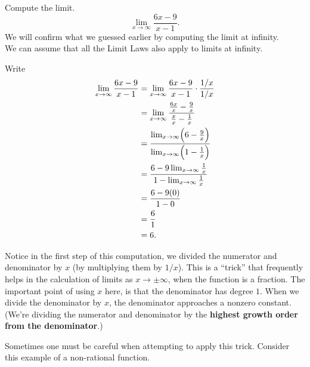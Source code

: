 \documentclass{ximera}
\begin{document}
\begin{example}  Compute the limit.
\[
\lim_{x\to\infty} \frac{6x-9}{x-1}.
\]
We will confirm what we guessed earlier by computing the limit at infinity.\\
 We can assume that all the Limit Laws also apply to limits at infinity.
\begin{explanation}
Write
\begin{align*}
\lim_{x\to\infty}\frac{6x-9}{x-1} &= \lim_{x\to\infty}\frac{6x-9}{x-1}\cdot \frac{1/x}{1/x}\\
&=\lim_{x\to\infty}\frac{\frac{6x}{x} - \frac{9}{x}}{\frac{x}{x} - \frac{1}{x}}\\
&=\frac{\lim_{x\to\infty}\Bigl(6- \frac{9}{x}\Bigr)}{\lim_{x\to\infty}\Bigl(1- \frac{1}{x}\Bigr)}\\
&=\frac{6-9\lim_{x\to\infty}  \frac{1}{x}}{1-\lim_{x\to\infty} \frac{1}{x}}\\
&=\frac{6-9(0)}{1-0}\\
&=  \frac{6}{1}\\
&= 6.
\end{align*}
\end{explanation}
\end{example}

Notice in the first step of this computation, we divided the numerator and denominator by $x$ (by multiplying them by $1/x$). This is a ``trick''
that frequently helps in the calculation of limits as $x\to \pm \infty$, when the function is a fraction. The important point of using $x$ here, is that the
denominator has degree $1$. When we divide the denominator by $x$, the denominator approaches a nonzero constant. 
(We're dividing the numerator and denominator by the \textbf{highest growth order from the denominator}.)

Sometimes one must be careful when attempting to apply this trick. Consider this example of a non-rational function.
\end{document}

